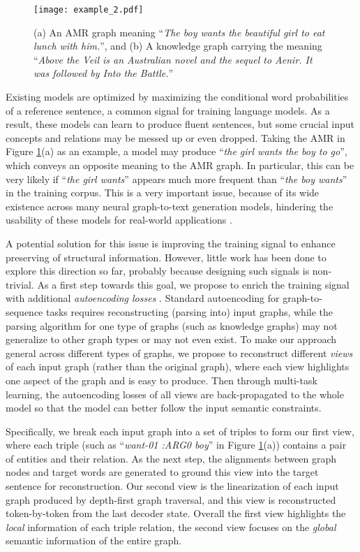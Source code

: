 \documentclass[11pt,a4paper]{article}
\begin{document}
\begin{figure}
    \centering
    \texttt{[image: example\_2.pdf]}
    \caption{(a) An AMR graph meaning ``\emph{The boy wants the beautiful girl to eat lunch with him.}'', and (b) A knowledge graph carrying the meaning ``\emph{Above the Veil is an Australian novel and the sequel to Aenir. It was followed by Into the Battle.}''}
    \label{fig:example}
    \vspace{-1.0em}
\end{figure}


Existing models are optimized by maximizing the conditional word probabilities of a reference sentence, a common signal for training language models.
As a result, these models can learn to produce fluent sentences, but some crucial input concepts and relations may be messed up or even dropped.
Taking the AMR in Figure \ref{fig:example}(a) as an example, a model may produce ``\emph{the girl wants the boy to go}'', which conveys an opposite meaning to the AMR graph.
In particular, this can be very likely if ``\emph{the girl wants}'' appears much more frequent than ``\emph{the boy wants}'' in the training corpus.
This is a very important issue, because of its wide existence across many neural graph-to-text generation models, hindering the usability of these models for real-world applications \citep{duvsek2018findings,duvsek2019semantic,balakrishnan-etal-2019-constrained}.


A potential solution for this issue is improving the training signal to enhance preserving of structural information.
However, little work has been done to explore this direction so far, probably because designing such signals is non-trivial.
As a first step towards this goal, we propose to enrich the training signal with additional \emph{autoencoding losses} \citep{rei2017semi}.
Standard autoencoding 
for graph-to-sequence tasks 
requires reconstructing (parsing into) input graphs, while the parsing algorithm for one type of graphs (such as knowledge graphs) may not generalize to other graph types or may not even exist.
To make our approach general across different types of graphs, we propose to reconstruct different \emph{views} of each input graph (rather than the original graph), where each view highlights one aspect of the graph and is easy to produce.
Then through multi-task learning, the autoencoding losses of all views are back-propagated to the whole model so that the model can better follow the input semantic constraints.


Specifically, we break each input graph into a set of triples to form our first view, where each triple (such as ``\emph{want-01 :ARG0 boy}'' in Figure \ref{fig:example}(a)) contains a pair of entities and their relation.
As the next step, the alignments between graph nodes and target words are generated to ground this view into the target sentence for reconstruction.
Our second view is the linearization of each input graph produced by depth-first graph traversal, and this view is reconstructed token-by-token from the last decoder state.
Overall the first view highlights the \emph{local} information of each triple relation, the second view focuses on the \emph{global} semantic information of the entire graph.
\end{document}
